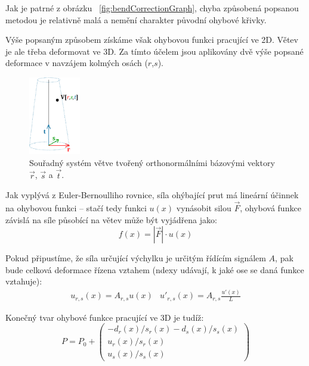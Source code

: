 Jak je patrné z obrázku ~\ref{fig:bendCorrectionGraph}, chyba způsobená popsanou metodou je relativně malá a nemění charakter původní ohybové křivky.

Výše popsaným způsobem získáme však ohybovou funkci pracující ve 2D. Větev je ale třeba deformovat ve 3D. Za tímto účelem jsou aplikovány dvě výše popsané deformace v navzájem kolmých osách ($r$,$s$). 

\begin{figure}[!hbt]
\begin{center}
\includegraphics[width=0.2\textwidth]{./figures/branchCoords.png}
\end{center}
\caption{ Souřadný systém větve tvořený orthonormálními bázovými vektory $\vec{r}$, $\vec{s}$ a $\vec{t}$.
\label{fig:branchCoords}
}
\end{figure}

Jak vyplývá z Euler-Bernoulliho rovnice, síla ohýbající prut má lineární účinnek na ohybovou funkci – stačí tedy funkci $u(x)$ vynásobit silou $\vec{F}$, ohybová funkce závislá na síle působící na větev může být vyjádřena jako:
 \begin{equation}
\label{forceEq}
f(x) = |\vec{F}| \cdot u(x)
\end{equation}

Pokud připustíme, že síla určující výchylku je určitým řídícím signálem $A$, pak bude celková deformace řízena vztahem (ndexy udávají, k jaké ose se daná funkce vztahuje):
\begin{equation}
\begin{array}{cc}
u_{r,s}(x) = A_{r,s}u(x) & {u}'_{r,s}(x) = A_{r,s}\frac{{u}'(x)}{L}
\end{array}
\end{equation}


Konečný tvar ohybové funkce pracující ve 3D je tudíž:
\begin{equation}
P = P_0 + \begin{pmatrix}
-d_r(x)/ s_r(x)-d_s(x)/s_s(x) \\ u_r(x)/s_r(x) \\ u_s(x)/s_s(x)
\end{pmatrix}
\end{equation}

